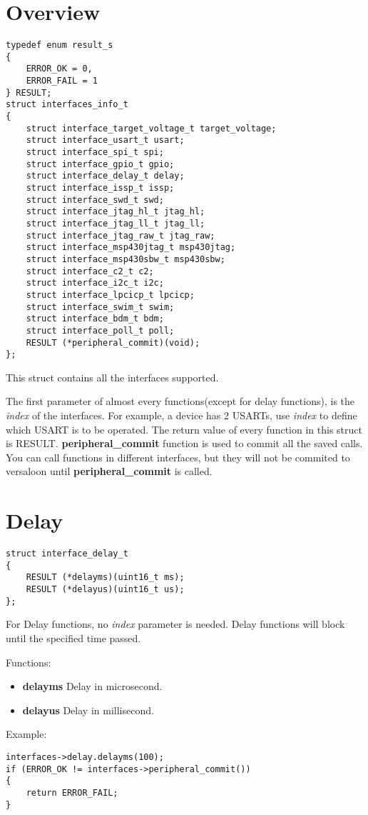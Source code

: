 \documentclass[a4paper,12pt]{book}
\begin{document}
\section{Overview}
\begin{lstlisting}
typedef enum result_s
{
	ERROR_OK = 0,
	ERROR_FAIL = 1
} RESULT;
struct interfaces_info_t
{
	struct interface_target_voltage_t target_voltage;
	struct interface_usart_t usart;
	struct interface_spi_t spi;
	struct interface_gpio_t gpio;
	struct interface_delay_t delay;
	struct interface_issp_t issp;
	struct interface_swd_t swd;
	struct interface_jtag_hl_t jtag_hl;
	struct interface_jtag_ll_t jtag_ll;
	struct interface_jtag_raw_t jtag_raw;
	struct interface_msp430jtag_t msp430jtag;
	struct interface_msp430sbw_t msp430sbw;
	struct interface_c2_t c2;
	struct interface_i2c_t i2c;
	struct interface_lpcicp_t lpcicp;
	struct interface_swim_t swim;
	struct interface_bdm_t bdm;
	struct interface_poll_t poll;
	RESULT (*peripheral_commit)(void);
};
\end{lstlisting}
This struct contains all the interfaces supported.

The first parameter of almost every functions(except for delay functions), is the \emph{index} of the interfaces. For example, a device has 2 USARTs, use \emph{index} to define which USART is to be operated. The return value of every function in this struct is RESULT. \textbf{peripheral\_commit} function is used to commit all the saved calls. You can call functions in different interfaces, but they will not be commited to versaloon until \textbf{peripheral\_commit} is called.

\newpage
\section{Delay}
\begin{lstlisting}
struct interface_delay_t
{
	RESULT (*delayms)(uint16_t ms);
	RESULT (*delayus)(uint16_t us);
};
\end{lstlisting}
For Delay functions, no \emph{index} parameter is needed. Delay functions will block until the specified time passed.

\vspace{6pt}
Functions:
\begin{itemize}
\item \textbf{delayms}
Delay in microsecond.
\item \textbf{delayus}
Delay in millisecond.
\end{itemize}

\vspace{6pt}
Example:
\begin{lstlisting}
interfaces->delay.delayms(100);
if (ERROR_OK != interfaces->peripheral_commit())
{
	return ERROR_FAIL;
}
\end{lstlisting}
\end{document}
